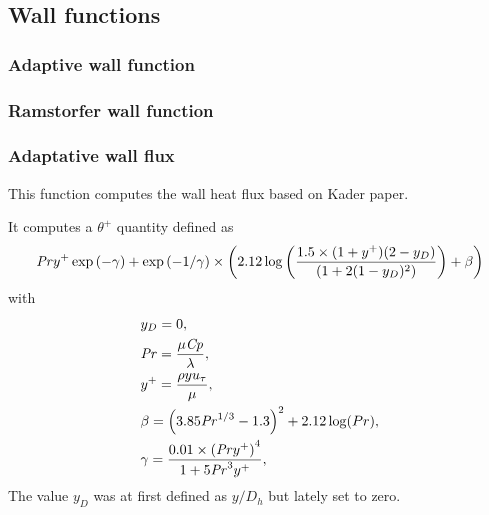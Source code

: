 \subsection{Wall functions}
\subsubsection{Adaptive wall function}
\subsubsection{Ramstorfer wall function}
\subsubsection{Adaptative wall flux}

This function computes the wall heat flux based on Kader paper.

It computes a $\theta^+$ quantity defined as
\begin{equation}
    \mathit{Pr} y^+ \exp\left( -\gamma \right) + \exp\left( -1/\gamma \right) \times \left( 2.12 \log\left( \frac{1.5 \times (1+y^+) (2-y_D)}{(1+2(1-y_D)^2)} \right) + \beta \right)
\end{equation}
with
\begin{align}
    & y_D = 0,\\
    &\mathit{Pr} = \frac{\mu \mathit{Cp}}{\lambda},\\
    &y^+ = \frac{\rho y u_{\tau}}{\mu},\\
    &\beta = \left( 3.85\mathit{Pr}^{1/3}-1.3 \right)^2 + 2.12\log(Pr),\\
    &\gamma = \frac{0.01\times \left( \mathit{Pr} y^+ \right)^4}{1+5\mathit{Pr}^3y^+},
\end{align}
The value $y_D$ was at first defined as $y/D_h$ but lately set to zero.
